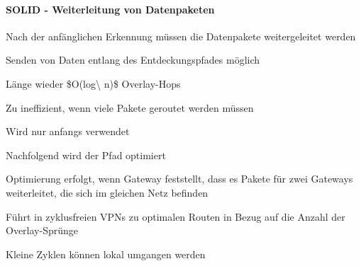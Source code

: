 \documentclass[a4paper]{article}
\begin{document}
\begin{multicols}{3}
\begin{itemize*}
            \paragraph{SOLID - Weiterleitung von
                  Datenpaketen}
            \begin{itemize*}
                  \item       Nach der anfänglichen Erkennung müssen die Datenpakete weitergeleitet
                  werden
                  \item       Senden von Daten entlang des Entdeckungspfades möglich
                  \begin{itemize*}
                        \item Länge wieder \$O(log\textbackslash{} n)\$ Overlay-Hops
                        \item Zu ineffizient, wenn viele Pakete geroutet werden müssen
                        \item Wird nur anfangs verwendet
                  \end{itemize*}
                  \item       Nachfolgend wird der Pfad optimiert
                  \begin{itemize*}
                        \item Optimierung erfolgt, wenn Gateway feststellt, dass es Pakete für zwei Gateways weiterleitet, die sich im gleichen Netz befinden
                        \item Führt in zyklusfreien VPNs zu optimalen Routen in Bezug auf die Anzahl der Overlay-Sprünge
                        \item Kleine Zyklen können lokal umgangen werden
                  \end{itemize*}
            \end{itemize*}


\end{itemize*}
\end{multicols}
\end{document}
